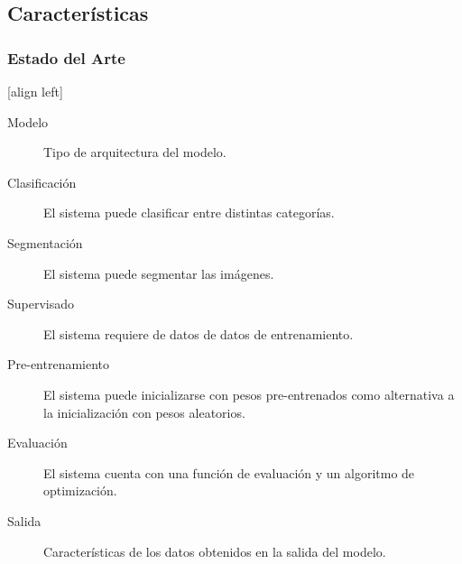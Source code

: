 \documentclass{beamer}
\begin{document}
\subsection{Características}
\begin{frame}
    \frametitle{Estado del Arte}
    [align left]
    \begin{description}
        \item[Modelo]{Tipo de arquitectura del modelo.}
        \item[Clasificación]{El sistema puede clasificar entre distintas categorías.}
        \item[Segmentación]{El sistema puede segmentar las imágenes.}
        \item[Supervisado]{ El sistema requiere de datos de datos de entrenamiento.}
        \item[Pre-entrenamiento]{El sistema puede inicializarse con pesos pre-entrenados como alternativa a la inicialización con pesos aleatorios.}
        \item[Evaluación]{El sistema cuenta con una función de evaluación y un algoritmo de optimización.}
        \item[Salida]{Características de los datos obtenidos en la salida del modelo.}
    \end{description}
\end{frame}
\end{document}
